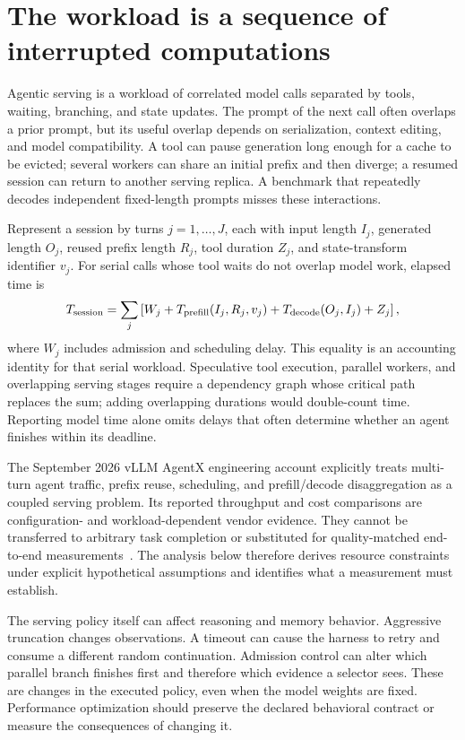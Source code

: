 \section{The workload is a sequence of interrupted computations}\label{sec:C31:01}
Agentic serving is a workload of correlated model calls separated by tools, waiting, branching, and state updates. The prompt of the next call often overlaps a prior prompt, but its useful overlap depends on serialization, context editing, and model compatibility. A tool can pause generation long enough for a cache to be evicted; several workers can share an initial prefix and then diverge; a resumed session can return to another serving replica. A benchmark that repeatedly decodes independent fixed-length prompts misses these interactions.

Represent a session by turns $j=1,\ldots,J$, each with input length $I_j$, generated length $O_j$, reused prefix length $R_j$, tool duration $Z_j$, and state-transform identifier $v_j$. For serial calls whose tool waits do not overlap model work, elapsed time is
\begin{equation}
 T_{\rm session}=\sum_j
 \left[W_j+T_{\rm prefill}(I_j,R_j,v_j)
 +T_{\rm decode}(O_j,I_j)+Z_j\right],
\end{equation}
where $W_j$ includes admission and scheduling delay. This equality is an accounting identity for that serial workload. Speculative tool execution, parallel workers, and overlapping serving stages require a dependency graph whose critical path replaces the sum; adding overlapping durations would double-count time. Reporting model time alone omits delays that often determine whether an agent finishes within its deadline.

The September 2026 vLLM AgentX engineering account explicitly treats multi-turn agent traffic, prefix reuse, scheduling, and prefill/decode disaggregation as a coupled serving problem. Its reported throughput and cost comparisons are configuration- and workload-dependent vendor evidence. They cannot be transferred to arbitrary task completion or substituted for quality-matched end-to-end measurements~\cite{root_vllm2026agentx}. The analysis below therefore derives resource constraints under explicit hypothetical assumptions and identifies what a measurement must establish.

The serving policy itself can affect reasoning and memory behavior. Aggressive truncation changes observations. A timeout can cause the harness to retry and consume a different random continuation. Admission control can alter which parallel branch finishes first and therefore which evidence a selector sees. These are changes in the executed policy, even when the model weights are fixed. Performance optimization should preserve the declared behavioral contract or measure the consequences of changing it.


